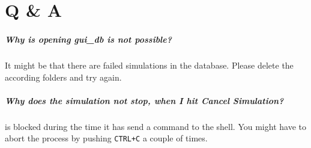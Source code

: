 \chapter{Q \& A}

\paragraph{Why is opening gui\_db is not possible?} It might be that there are failed simulations in the
database. Please delete the according folders and try again.

\paragraph{Why does the simulation not stop, when I hit \emph{Cancel Simulation}?} \matlab is blocked during
the time it has send a command to the shell. You might have to abort the process by pushing \verb|CTRL+C|
a couple of times.